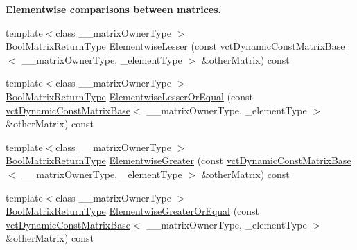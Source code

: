 \begin{Indent}{\bf Elementwise comparisons between matrices.}
\begin{DoxyCompactItemize}
\item 
{\footnotesize template$<$class \+\_\+\+\_\+matrix\+Owner\+Type $>$ }\\\hyperlink{classvct_dynamic_const_matrix_base_ac71d88dda7abaaeb2276b83f2e49def7}{Bool\+Matrix\+Return\+Type} \hyperlink{classvct_dynamic_const_matrix_base_ad3ac49d89bf4bc67cda0e033098d1449}{Elementwise\+Lesser} (const \hyperlink{classvct_dynamic_const_matrix_base}{vct\+Dynamic\+Const\+Matrix\+Base}$<$ \+\_\+\+\_\+matrix\+Owner\+Type, \+\_\+element\+Type $>$ \&other\+Matrix) const 
\item 
{\footnotesize template$<$class \+\_\+\+\_\+matrix\+Owner\+Type $>$ }\\\hyperlink{classvct_dynamic_const_matrix_base_ac71d88dda7abaaeb2276b83f2e49def7}{Bool\+Matrix\+Return\+Type} \hyperlink{classvct_dynamic_const_matrix_base_a70bd8148355ce894b3c072f0fb6d1372}{Elementwise\+Lesser\+Or\+Equal} (const \hyperlink{classvct_dynamic_const_matrix_base}{vct\+Dynamic\+Const\+Matrix\+Base}$<$ \+\_\+\+\_\+matrix\+Owner\+Type, \+\_\+element\+Type $>$ \&other\+Matrix) const 
\item 
{\footnotesize template$<$class \+\_\+\+\_\+matrix\+Owner\+Type $>$ }\\\hyperlink{classvct_dynamic_const_matrix_base_ac71d88dda7abaaeb2276b83f2e49def7}{Bool\+Matrix\+Return\+Type} \hyperlink{classvct_dynamic_const_matrix_base_aec3e77640ffca9a348ca0725dc183668}{Elementwise\+Greater} (const \hyperlink{classvct_dynamic_const_matrix_base}{vct\+Dynamic\+Const\+Matrix\+Base}$<$ \+\_\+\+\_\+matrix\+Owner\+Type, \+\_\+element\+Type $>$ \&other\+Matrix) const 
\item 
{\footnotesize template$<$class \+\_\+\+\_\+matrix\+Owner\+Type $>$ }\\\hyperlink{classvct_dynamic_const_matrix_base_ac71d88dda7abaaeb2276b83f2e49def7}{Bool\+Matrix\+Return\+Type} \hyperlink{classvct_dynamic_const_matrix_base_af784b65a11b22ebb7a9c3b505e7322a5}{Elementwise\+Greater\+Or\+Equal} (const \hyperlink{classvct_dynamic_const_matrix_base}{vct\+Dynamic\+Const\+Matrix\+Base}$<$ \+\_\+\+\_\+matrix\+Owner\+Type, \+\_\+element\+Type $>$ \&other\+Matrix) const 
\end{DoxyCompactItemize}
\end{Indent}
